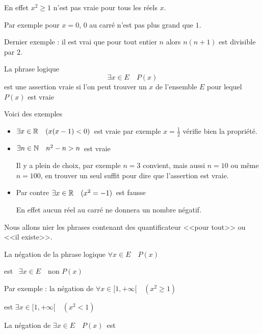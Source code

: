 En effet $x^2\ge 1$ n'est pas vraie pour tous les réels $x$.

Par exemple pour $x=0$, $0$ au carré n'est pas plus grand que $1$.



\change

Dernier exemple :
il est vrai que pour tout entier 
$n$ alors $n(n+1)$ est divisible par $2$.


\diapo

La phrase logique 
$$\exists x \in E \quad P(x)$$
est une assertion vraie si l'on peut trouver un $x$ de l'ensemble $E$ pour lequel $P(x)$ est vraie


\change

Voici des exemples 

\begin{itemize}
  \item \og $\exists x \in \mathbb{R} \quad (x(x-1)<0)$\fg\ est vraie
par exemple $x=\frac 12$ vérifie bien la propriété.


  \item \og $\exists n \in \mathbb{N} \quad n^2-n > n$\fg\ est vraie

Il y a plein de choix, par exemple $n=3$ convient, mais aussi $n=10$ ou même
$n=100$, en trouver un seul suffit pour dire que l'assertion est vraie.

  \item Par contre \og $\exists x \in \mathbb{R} \quad (x^2=-1)$\fg\ est fausse

En effet aucun réel au carré ne donnera un nombre négatif.
\end{itemize} 



\diapo

Nous allons nier les phrases contenant des quantificateur <<pour tout>>
ou <<il existe>>.

La négation de la phrase logique \og $\forall x \in E \quad P(x)$\fg  

est \ \og $\exists x \in E \quad \text{non } P(x)$\fg

\change

Par exemple : la négation de \og $\forall x \in [1,+\infty[ \quad (x^2\ge 1)$\fg

est  \og $\exists x \in [1,+\infty[ \quad (x^2 < 1)$\fg

\change


La négation de \og $\exists x \in E \quad P(x)$\fg \ est 

